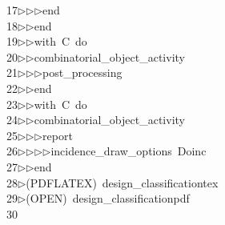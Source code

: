 \begin{tabbing}
17\>$\triangleright$\>$\triangleright$\>$\triangleright$\>end\ \\[0pt]
18\>$\triangleright$\>$\triangleright$\>end\ \\[0pt]
19\>$\triangleright$\>$\triangleright$\>with\ C\ do\ \\[0pt]
20\>$\triangleright$\>$\triangleright$\>combinatorial\_object\_activity\ \\[0pt]
21\>$\triangleright$\>$\triangleright$\>$\triangleright$\>post\_processing\ \\[0pt]
22\>$\triangleright$\>$\triangleright$\>end\ \\[0pt]
23\>$\triangleright$\>$\triangleright$\>with\ C\ do\ \\[0pt]
24\>$\triangleright$\>$\triangleright$\>combinatorial\_object\_activity\ \\[0pt]
25\>$\triangleright$\>$\triangleright$\>$\triangleright$\>report\ \\[0pt]
26\>$\triangleright$\>$\triangleright$\>$\triangleright$\>$\triangleright$\>incidence\_draw\_options\ Doinc\ \\[0pt]
27\>$\triangleright$\>$\triangleright$\>end\\[0pt]
28\>$\triangleright$\>(PDFLATEX)\ design\_classificationtex\\[0pt]
29\>$\triangleright$\>(OPEN)\ design\_classificationpdf\\[0pt]
30\>\end{tabbing}
